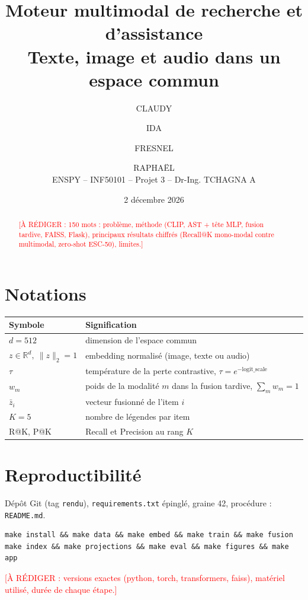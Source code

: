 \documentclass[11pt,a4paper]{article}
\title{Moteur multimodal de recherche et d'assistance\\
\large Texte, image et audio dans un espace commun}
\author{CLAUDY \and IDA \and FRESNEL \and RAPHA\"EL\\[0.5ex]
ENSPY -- INF50101 -- Projet 3 -- Dr-Ing. TCHAGNA A}
\date{2 d\'ecembre 2026}
\newcommand{\TODO}[1]{\textcolor{red}{[À RÉDIGER : #1]}}      %
\newcommand{\R}{\mathbb{R}}
\newcommand{\norm}[1]{\lVert #1\rVert_2}
\begin{document}
\maketitle

\begin{abstract}
\TODO{150 mots : problème, méthode (CLIP, AST + tête MLP, fusion tardive, FAISS, Flask), principaux résultats chiffrés
(Recall@K mono-modal contre multimodal, zero-shot ESC-50), limites.}
\end{abstract}

\tableofcontents
\newpage













\appendix
\section{Notations}
\begin{tabular}{@{}ll@{}}
\toprule
Symbole & Signification\\
\midrule
$d=512$ & dimension de l'espace commun\\
$z\in\R^d,\ \norm{z}=1$ & embedding normalisé (image, texte ou audio)\\
$\tau$ & température de la perte contrastive, $\tau=e^{-\text{logit\_scale}}$\\
$w_m$ & poids de la modalité $m$ dans la fusion tardive, $\sum_m w_m=1$\\
$\bar z_i$ & vecteur fusionné de l'item $i$\\
$K=5$ & nombre de légendes par item\\
R@K, P@K & Recall et Precision au rang $K$\\
\bottomrule
\end{tabular}

\section{Reproductibilité}
Dépôt Git (tag \texttt{rendu}), \texttt{requirements.txt} épinglé, graine 42, procédure : \texttt{README.md}.
\begin{verbatim}
make install && make data && make embed && make train && make fusion
make index && make projections && make eval && make figures && make app
\end{verbatim}
\TODO{versions exactes (python, torch, transformers, faiss), matériel utilisé, durée de chaque étape.}
\end{document}
